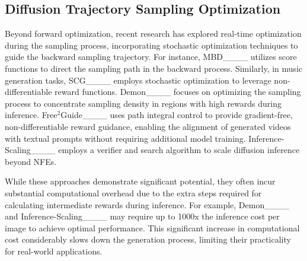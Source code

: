 \subsection{Diffusion Trajectory Sampling Optimization}
Beyond forward optimization, recent research has explored real-time optimization during the sampling process, incorporating stochastic optimization techniques to guide the backward sampling trajectory. For instance, MBD____ utilizes score functions to direct the sampling path in the backward process. Similarly, in music generation tasks, SCG____ employs stochastic optimization to leverage non-differentiable reward functions. Demon____ focuses on optimizing the sampling process to concentrate sampling density in regions with high rewards during inference. Free$^{2}$Guide____ uses path integral control to provide gradient-free, non-differentiable reward guidance, enabling the alignment of generated videos with textual prompts without requiring additional model training. Inference-Scaling____ employs a verifier and search algorithm to scale diffusion inference beyond NFEs.  

While these approaches demonstrate significant potential, they often incur substantial computational overhead due to the extra steps required for calculating intermediate rewards during inference. For example, Demon____ and Inference-Scaling____ may require up to 1000x the inference cost per image to achieve optimal performance. This significant increase in computational cost considerably slows down the generation process, limiting their practicality for real-world applications.